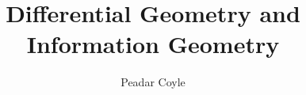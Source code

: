 \documentclass[a4paper,10pt]{article}
\title{Differential Geometry and Information Geometry}
\author{Peadar Coyle}
\begin{document}
\maketitle
{}
\tableofcontents
\listoffigures
\listoftables

\begin{abstract}
\end{abstract}




%



\end{document}
